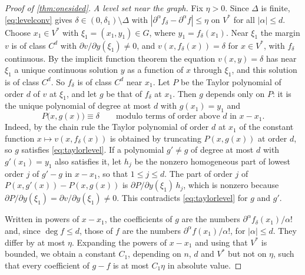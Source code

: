 \begin{proof}[Proof of \cref{thm:onesided}]
\emph{A level set near the graph.} Fix $\eta>0$. Since $\Delta$ is finite, \eqref{eq:levelconv} gives $\delta\in(0,\delta_1)\setminus\Delta$ with $|\partial^\alpha f_\delta-\partial^\alpha f|\le\eta$ on $V^*$ for all $|\alpha|\le d$. Choose $x_1\in V^*$ with $\xi_1=(x_1,y_1)\in G$, where $y_1=f_\delta(x_1)$. Near $\xi_1$ the margin $v$ is of class $C^d$ with $\partial v/\partial y(\xi_1)\ne0$, and $v(x,f_\delta(x))=\delta$ for $x\in V^*$, with $f_\delta$ continuous. By the implicit function theorem the equation $v(x,y)=\delta$ has near $\xi_1$ a unique continuous solution $y$ as a function of $x$ through $\xi_1$, and this solution is of class $C^d$. So $f_\delta$ is of class $C^d$ near $x_1$. Let $P$ be the Taylor polynomial of order $d$ of $v$ at $\xi_1$, and let $g$ be that of $f_\delta$ at $x_1$. Then $g$ depends only on $P$: it is the unique polynomial of degree at most $d$ with $g(x_1)=y_1$ and
\begin{equation}\label{eq:taylorlevel}
P\bigl(x,g(x)\bigr)\equiv\delta\qquad\text{modulo terms of order above $d$ in $x-x_1$.}
\end{equation}
Indeed, by the chain rule the Taylor polynomial of order $d$ at $x_1$ of the constant function $x\mapsto v(x,f_\delta(x))$ is obtained by truncating $P(x,g(x))$ at order $d$, so $g$ satisfies \eqref{eq:taylorlevel}. If a polynomial $g'\ne g$ of degree at most $d$ with $g'(x_1)=y_1$ also satisfies it, let $h_j$ be the nonzero homogeneous part of lowest order $j$ of $g'-g$ in $x-x_1$, so that $1\le j\le d$. The part of order $j$ of $P(x,g'(x))-P(x,g(x))$ is $\partial P/\partial y(\xi_1)\,h_j$, which is nonzero because $\partial P/\partial y(\xi_1)=\partial v/\partial y(\xi_1)\ne0$. This contradicts \eqref{eq:taylorlevel} for $g$ and $g'$.

Written in powers of $x-x_1$, the coefficients of $g$ are the numbers $\partial^\alpha f_\delta(x_1)/\alpha!$ and, since $\deg f\le d$, those of $f$ are the numbers $\partial^\alpha f(x_1)/\alpha!$, for $|\alpha|\le d$. They differ by at most $\eta$. Expanding the powers of $x-x_1$ and using that $V^*$ is bounded, we obtain a constant $C_1$, depending on $n$, $d$ and $V^*$ but not on $\eta$, such that every coefficient of $g-f$ is at most $C_1\eta$ in absolute value.


\end{proof}
